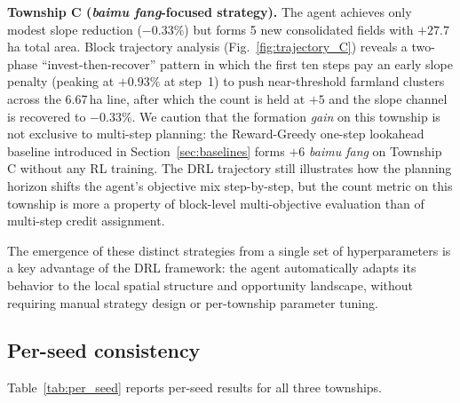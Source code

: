 \documentclass[preprint,12pt]{elsarticle}
\begin{document}
\textbf{Township C (\textit{baimu fang}-focused strategy).} The agent achieves only modest slope reduction ($-0.33\%$) but forms 5 new consolidated fields with $+27.7$\,ha total area. Block trajectory analysis (Fig.~\ref{fig:trajectory_C}) reveals a two-phase ``invest-then-recover'' pattern in which the first ten steps pay an early slope penalty (peaking at $+0.93\%$ at step~1) to push near-threshold farmland clusters across the 6.67\,ha line, after which the count is held at $+5$ and the slope channel is recovered to $-0.33\%$. We caution that the formation \emph{gain} on this township is not exclusive to multi-step planning: the Reward-Greedy one-step lookahead baseline introduced in Section~\ref{sec:baselines} forms $+6$ \textit{baimu fang} on Township C without any RL training. The DRL trajectory still illustrates how the planning horizon shifts the agent's objective mix step-by-step, but the count metric on this township is more a property of block-level multi-objective evaluation than of multi-step credit assignment.

The emergence of these distinct strategies from a single set of hyperparameters is a key advantage of the DRL framework: the agent automatically adapts its behavior to the local spatial structure and opportunity landscape, without requiring manual strategy design or per-township parameter tuning.

\subsection{Per-seed consistency}
\label{sec:consistency}

Table~\ref{tab:per_seed} reports per-seed results for all three townships.
\end{document}
